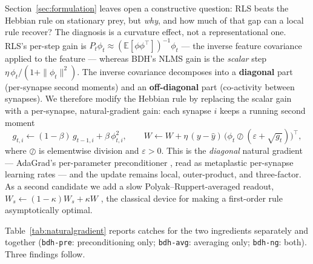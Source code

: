 \documentclass[11pt]{article}
\begin{document}
Section~\ref{sec:formulation} leaves open a constructive question: RLS beats the Hebbian rule on
stationary prey, but \emph{why}, and how much of that gap can a local rule recover? The diagnosis
is a curvature effect, not a representational one. RLS's per-step gain is
$P_t \phi_t \approx (\mathbb{E}[\phi\phi^\top])^{-1}\phi_t$ --- the inverse feature covariance
applied to the feature --- whereas BDH's NLMS gain is the \emph{scalar} step
$\eta\,\phi_t/(1+\|\phi_t\|^2)$. The inverse covariance decomposes into a \textbf{diagonal} part
(per-synapse second moments) and an \textbf{off-diagonal} part (co-activity between synapses). We
therefore modify the Hebbian rule by replacing the scalar gain with a per-synapse,
natural-gradient gain: each synapse $i$ keeps a running second moment
\begin{equation}
g_{t,i} \leftarrow (1-\beta)\,g_{t-1,i} + \beta\,\phi_{t,i}^2, \qquad
W \leftarrow W + \eta\,(y - \hat y)\,\big(\phi_t \oslash (\varepsilon + \sqrt{g_t})\big)^\top,
\end{equation}
where $\oslash$ is elementwise division and $\varepsilon > 0$. This is the \emph{diagonal}
natural gradient --- AdaGrad's per-parameter preconditioner \cite{duchi2011}, read as metaplastic
per-synapse learning rates --- and the update remains local, outer-product, and three-factor. As
a second candidate we add a slow Polyak--Ruppert-averaged readout,
$W_s \leftarrow (1-\kappa)W_s + \kappa W$ \cite{polyak1992}, the classical device for making a
first-order rule asymptotically optimal.

Table~\ref{tab:naturalgradient} reports catches for the two ingredients separately and together
(\texttt{bdh-pre}: preconditioning only; \texttt{bdh-avg}: averaging only; \texttt{bdh-ng}: both).
Three findings follow.
\end{document}
